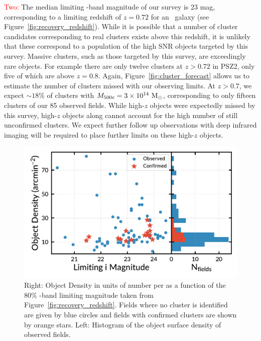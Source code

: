 \documentclass[apj, revtex4-1]{emulateapj}
\newcommand{\editorial}[1]{\textcolor{red}{#1}}
\begin{document}
\editorial{Two:} The median limiting \sdssi-band magnitude of our survey is 23 mag, corresponding to a limiting redshift of $z=0.72$ for an \mstar\ galaxy (see Figure~\ref{fig:recovery_redshift}). While it is possible that a number of cluster candidates corresponding to real clusters exists above this redshift, it is unlikely that these correspond to a population of the high SNR objects targeted by this survey. Massive clusters, such as those targeted by this survey, are exceedingly rare objects. For example there are only twelve clusters at $z>0.72$ in PSZ2, only five of which are above $z=0.8$. Again, Figure~\ref{fig:cluster_forecast} allows us to estimate the number of clusters missed with our observing limits. At $z>0.7$, we expect $\sim18\%$ of clusters with
$M_{500c}=3\times10^{14}~\hbox{$\mathrm{M}_\odot$}$, corresponding to only fifteen clusters of our 85 observed fields. While high-$z$ objects were expectedly missed by this survey, high-$z$ objects along cannot account for the high number of still unconfirmed clusters. We expect further follow up observations with deep infrared imaging will be required to place further limits on these high-$z$ objects.

\begin{figure}
	\includegraphics[width=\columnwidth]{figures/N_vs_density.pdf}
	\caption{Right: Object Density in units of number per \arcminsq as a function of the 80\% \sdssi-band limiting magnitude taken from Figure~\ref{fig:recovery_redshift}. Fields where no cluster is identified are given by blue circles and fields with confirmed clusters are shown by orange stars. Left: Histogram of the object surface density of observed fields.}
	\label{fig:N_vs_density}
\end{figure}
\end{document}

